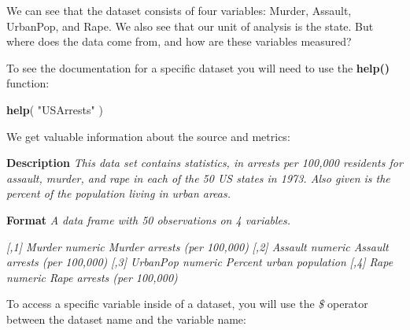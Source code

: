 \documentclass[]{book}
\newenvironment{Shaded}{\begin{snugshade}}{\end{snugshade}}
\newcommand{\CommentTok}[1]{\textcolor[rgb]{0.56,0.35,0.01}{\textit{#1}}}
\newcommand{\DataTypeTok}[1]{\textcolor[rgb]{0.13,0.29,0.53}{#1}}
\newcommand{\KeywordTok}[1]{\textcolor[rgb]{0.13,0.29,0.53}{\textbf{#1}}}
\newcommand{\NormalTok}[1]{#1}
\newcommand{\OperatorTok}[1]{\textcolor[rgb]{0.81,0.36,0.00}{\textbf{#1}}}
\newcommand{\StringTok}[1]{\textcolor[rgb]{0.31,0.60,0.02}{#1}}
\theoremstyle{definition}
\theoremstyle{definition}
\theoremstyle{definition}
\theoremstyle{remark}
\begin{document}
We can see that the dataset consists of four variables: Murder, Assault,
UrbanPop, and Rape. We also see that our unit of analysis is the state.
But where does the data come from, and how are these variables measured?

To see the documentation for a specific dataset you will need to use the
\textbf{help()} function:

\begin{Shaded}
\begin{Highlighting}[]
\KeywordTok{help}\NormalTok{( }\StringTok{"USArrests"}\NormalTok{ )}
\end{Highlighting}
\end{Shaded}

We get valuable information about the source and metrics:

\textbf{Description} \emph{This data set contains statistics, in arrests
per 100,000 residents for assault, murder, and rape in each of the 50 US
states in 1973. Also given is the percent of the population living in
urban areas.}

\textbf{Format} \emph{A data frame with 50 observations on 4 variables.}

\emph{{[},1{]} Murder numeric Murder arrests (per 100,000)}
\emph{{[},2{]} Assault numeric Assault arrests (per 100,000)}
\emph{{[},3{]} UrbanPop numeric Percent urban population} \emph{{[},4{]}
Rape numeric Rape arrests (per 100,000)}

To access a specific variable inside of a dataset, you will use the
\emph{\$} operator between the dataset name and the variable name:

\begin{Shaded}
\end{Shaded}
\end{document}
